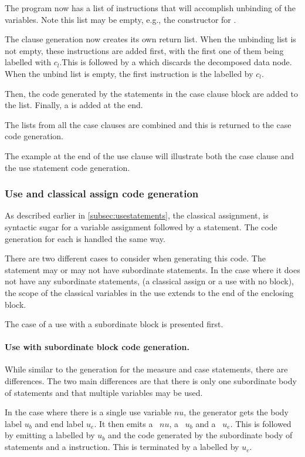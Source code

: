 The program now has a list of instructions that will accomplish unbinding
of the variables. Note this list may be empty, e.g., the 
constructor for .

The clause generation now creates its own return list. When the 
unbinding list is not empty, these instructions are added first, with
the first one of them being labelled with $c_l$.This is followed by
a  which discards the decomposed data node. 
When the unbind list  is
empty, the first instruction is the  labelled by $c_l$.

Then, the code generated by the statements in the case clause block are
added to the list. Finally, a  is added at the end.

The lists from all the case clauses are combined and this is returned to the
case code generation.

The example at the end of the use clause will illustrate both the case clause 
and the use statement code generation.

\subsubsection{Use and classical assign code generation}
As described earlier in \vref{subsec:usestatements}, the classical assignment, 
 is syntactic sugar for a variable assignment followed by
a  statement. The code generation for each is 
handled the same way.

There are two different cases to consider when generating this code.
 The  statement
may or may not have subordinate statements. In the case where it does not have
any subordinate statements, (a classical assign or a
 use with no block), the scope
of the classical variables in the use 
extends to the end of the enclosing block.

The case  of a use with a subordinate block  is presented first.

\paragraph{Use with subordinate block code generation.}
While similar to the generation for the measure and case statements,
there are differences. The two main differences are that there is only one
subordinate body of statements and that  multiple variables may be
used.

In the case where there is a single use variable $nu$, the generator gets
the body label $u_b$ and end label $u_e$. It then emits a 
~$nu$, a ~$u_b$ and a ~$u_e$.
This is followed by emitting
 a  labelled by $u_b$ and the code generated
by the subordinate body of statements and a  instruction.
This is terminated by a  labelled by $u_e$.

